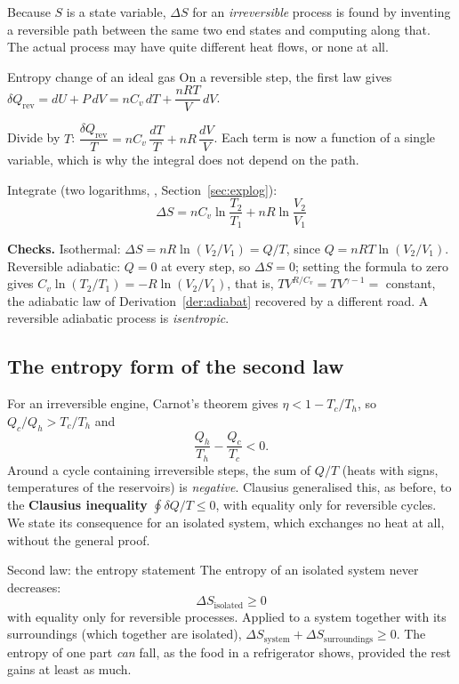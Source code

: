 Because $S$ is a state variable, $\Delta S$ for an \emph{irreversible} process is found by inventing a
reversible path between the same two end states and computing along that. The actual process may have
quite different heat flows, or none at all.

\begin{derivbox}{Entropy change of an ideal gas}\label{der:entropy-gas}
 On a reversible step, the first law gives $\delta Q_{\text{rev}}=dU+P\,dV=nC_v\,dT+\dfrac{nRT}{V}\,dV$.

 Divide by $T$:
$\dfrac{\delta Q_{\text{rev}}}{T}=nC_v\,\dfrac{dT}{T}+nR\,\dfrac{dV}{V}$. Each term is now a function of a single
variable, which is why the integral does not depend on the path.

 Integrate (two logarithms, , Section~\ref{sec:explog}):
\[
\boxed{\;\Delta S=nC_v\ln\frac{T_2}{T_1}+nR\ln\frac{V_2}{V_1}\;}
\]

 \textbf{Checks.} Isothermal: $\Delta S=nR\ln(V_2/V_1)=Q/T$, since $Q=nRT\ln(V_2/V_1)$. Reversible
adiabatic: $Q=0$ at every step, so $\Delta S=0$; setting the formula to zero gives
$C_v\ln(T_2/T_1)=-R\ln(V_2/V_1)$, that is, $TV^{R/C_v}=TV^{\gamma-1}=$ constant, the adiabatic law of
Derivation~\ref{der:adiabat} recovered by a different road. A reversible adiabatic process is
\emph{isentropic}.
\end{derivbox}

\subsection{The entropy form of the second law}

For an irreversible engine, Carnot's theorem gives $\eta<1-T_c/T_h$, so $Q_c/Q_h>T_c/T_h$ and
\[
\frac{Q_h}{T_h}-\frac{Q_c}{T_c}<0 .
\]
Around a cycle containing irreversible steps, the sum of $Q/T$ (heats with signs, temperatures of the
reservoirs) is \emph{negative}. Clausius generalised this, as before, to the \textbf{Clausius inequality}
$\oint\delta Q/T\le0$, with equality only for reversible cycles. We state its consequence for an isolated
system, which exchanges no heat at all, without the general proof.

\begin{keybox}{Second law: the entropy statement}\label{key:entropy-law}
The entropy of an isolated system never decreases:
\[
\boxed{\;\Delta S_{\text{isolated}}\ge0\;}
\]
with equality only for reversible processes. Applied to a system together with its surroundings (which
together are isolated), $\Delta S_{\text{system}}+\Delta S_{\text{surroundings}}\ge0$. The entropy of one
part \emph{can} fall, as the food in a refrigerator shows, provided the rest gains at least as much.
\end{keybox}

